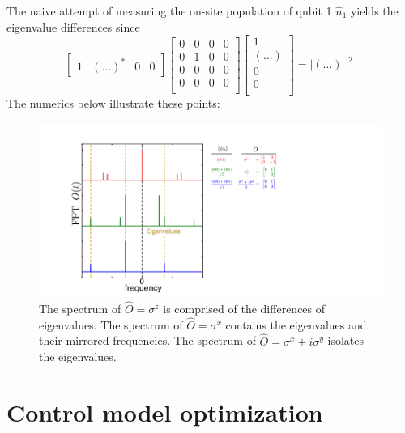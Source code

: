The naive attempt of measuring the on-site population of qubit 1 $\hat{n}_1$ yields the eigenvalue differences since
\begin{equation}
    \begin{bmatrix}
        1 & (\ldots)^* & 0 & 0
    \end{bmatrix}
    \begin{bmatrix}
        0 & 0 & 0 & 0 \\
        0 & 1 & 0 & 0 \\
        0 & 0 & 0 & 0 \\
        0 & 0 & 0 & 0 \\
    \, \end{bmatrix}
    \begin{bmatrix}
        1 \\
        (\ldots) \\
        0 \\
        0 \\
    \end{bmatrix}
    = \mid (\ldots) \mid^{2}
\end{equation}
The numerics below illustrate these points:
\begin{figure}[h]
    \begin{center}
        \includegraphics[width=250 mm]{./PDF/mbr_numerics_3qubit_o_psi0.pdf}
    \end{center}
    \caption{
    The spectrum of $\hat{O} = \sigma^z$ is comprised of the differences of eigenvalues.
    The spectrum of $\hat{O} = \sigma^x$ contains the eigenvalues and their mirrored frequencies.
    The spectrum of $\hat{O} = \sigma^x + i \sigma^y$ isolates the eigenvalues.
    }
    \label{mbr_peaks_numerics}
\end{figure}

\section{Control model optimization}

